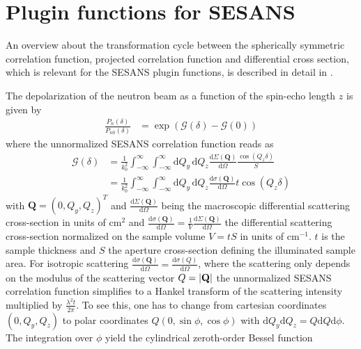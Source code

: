 \clearpage
\section{Plugin functions for SESANS}
\label{ch:pluginsSESANS}

An overview about the transformation cycle between the spherically symmetric correlation function, projected correlation function and differential cross section, which is relevant for the SESANS plugin functions, is described in detail in \cite{Kohlbrecher2017}.

The depolarization of the neutron beam as a function of the spin-echo length $z$ is given by
\begin{align}
\frac{P_n(\delta)}{P_{n0}(\delta)}&=\exp\left(\mathcal{G}(\delta)-\mathcal{G}(0)\right)
\end{align}
where the unnormalized SESANS correlation function reads as
\begin{align}
\mathcal{G}(\delta) &= \frac{1}{k_0^2} \int_{-\infty}^{\infty}\int_{-\infty}^{\infty} \mathrm{d}Q_y\, \mathrm{d}Q_z \frac{\mathrm{d}\Sigma(\mathbf{Q})}{\mathrm{d}\Omega}\frac{\cos(Q_z \delta)}{S} \\
             &= \frac{1}{k_0^2} \int_{-\infty}^{\infty}\int_{-\infty}^{\infty} \mathrm{d}Q_y\, \mathrm{d}Q_z  \frac{\mathrm{d}\sigma(\mathbf{Q})}{\mathrm{d}\Omega}t \cos(Q_z \delta)
\end{align}
with $\mathbf{Q}=(0,Q_y,Q_z)^T$ and $\frac{\mathrm{d}\Sigma(\mathbf{Q})}{\mathrm{d}\Omega}$ being the macroscopic differential scattering cross-section in units of cm$^2$ and $\frac{\mathrm{d}\sigma(\mathbf{Q})}{\mathrm{d}\Omega}=\frac{1}{V}\frac{\mathrm{d}\Sigma(\mathbf{Q})}{\mathrm{d}\Omega}$ the differential scattering cross-section normalized on the sample volume $V=tS$ in units of cm$^{-1}$. $t$ is the sample thickness and $S$ the aperture cross-section defining the illuminated sample area. For isotropic scattering $\frac{\mathrm{d}\sigma(\mathbf{Q})}{\mathrm{d}\Omega}=\frac{\mathrm{d}\sigma(Q)}{\mathrm{d}\Omega}$, where the scattering only depends on the modulus of the scattering vector $Q=\abs{\mathbf{Q}}$ the unnormalized SESANS correlation function simplifies to a Hankel transform of the scattering intensity multiplied by $\frac{\lambda^2 t}{2\pi}$. To see this, one has to change from cartesian coordinates $(0,Q_y,Q_z)$ to polar coordinates $Q (0,\sin\phi,\cos\phi)$ with $\mathrm{d}Q_y \mathrm{d}Q_z = Q\mathrm{d}Q \mathrm{d}\phi$. The integration over $\phi$ yield the cylindrical zeroth-order Bessel function
